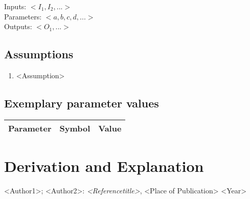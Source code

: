 \documentclass[10pt,a4paper]{article}
\begin{document}
	\noindent
	Inputs: $<I_1,I_2,...>$ 
	\\
	Parameters: $<a,b,c,d, ...>$ %
	\\
	Outputs: $<O_1,...>$ %
	
	
	\subsection{Assumptions} %
		\begin{enumerate} %
			\item <Assumption>
		\end{enumerate}
	
	
	\subsection{Exemplary parameter values}
	\begin{tabular}{lcl} 
		Parameter & Symbol & Value \\ \hline	
	\end{tabular}

	
	\section{Derivation and Explanation} %
	
	
	\begin{thebibliography}{10}		
		<Author1>; <Author2>: 
		\textit{<Referencetitle>}, <Place of Publication> <Year>
	\end{thebibliography}
\end{document}
